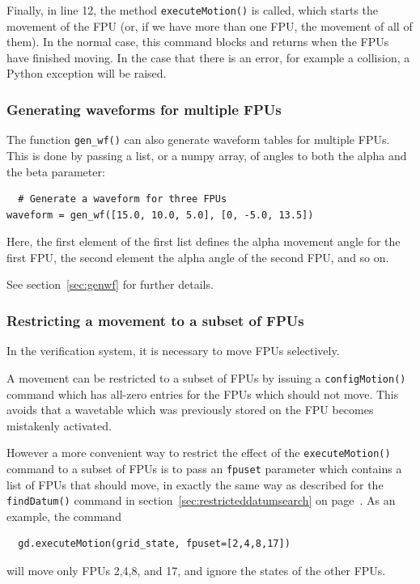 \documentclass[11pt,a4paper]{scrartcl}
\begin{document}
Finally, in line 12, the method \texttt{executeMotion()} is called,
which starts the movement of the FPU (or, if we have more than one
FPU, the movement of all of them). In the normal case, this command
blocks and returns when the FPUs have finished moving.  In the case
that there is an error, for example a collision, a Python exception
will be raised.

\subsubsection{Generating waveforms for multiple FPUs}
The function \texttt{gen\_wf()} can also generate waveform tables for
multiple FPUs. This is done by passing a list, or a numpy array,
of angles to both the alpha and the beta parameter:

\begin{verbatim}
  # Generate a waveform for three FPUs
waveform = gen_wf([15.0, 10.0, 5.0], [0, -5.0, 13.5])
\end{verbatim}

Here, the first element of the first list
defines the alpha movement angle for the
first FPU, the second element the alpha
angle of the second FPU, and so on.

See section~\ref{sec:genwf} for further details.

\subsubsection{Restricting a movement to a subset of FPUs}
  In the verification system, it is necessary
to move FPUs selectively.

A movement can be restricted to a subset of FPUs by issuing a
\texttt{configMotion()} command which has all-zero entries for the FPUs
which should not move. This avoids that a wavetable which was
previously stored on the FPU becomes mistakenly activated.

However a more convenient way to restrict the effect
of the \texttt{executeMotion()} command to a
subset of FPUs is to pass an \texttt{fpuset} parameter
which contains a list of FPUs that should move,
in exactly the same way as described for the \texttt{findDatum()}
command in section~\ref{sec:restricteddatumsearch}
on page~\pageref{sec:restricteddatumsearch}. As an example,
the command
\begin{verbatim}
  gd.executeMotion(grid_state, fpuset=[2,4,8,17])
\end{verbatim}
will move only FPUs 2,4,8, and 17, and ignore the states of the other
FPUs.
\end{document}
